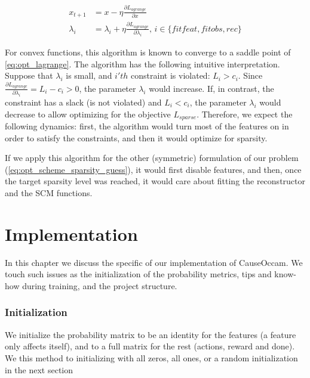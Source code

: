 \documentclass[a4paper,11pt,oneside]{report}
\newcommand{\sysname}{CauseOccam\xspace}
\begin{document}
\begin{equation}
\label{eq:primaldual}
\begin{array}{rl}
x_{t+1}&=x-\eta\frac{\partial L_{agrange}}{\partial x}\\
\lambda_i&=\lambda_i+\eta\frac{\partial L_{agrange}}{\partial \lambda_i},\,i\in\{fitfeat,fitobs,rec\}
\end{array}
\end{equation}

For convex functions, this algorithm is known to converge to a saddle point of \autoref{eq:opt_lagrange}. The algorithm has the following intuitive interpretation. Suppose that $\lambda_i$ is small, and $i'th$ constraint is violated: $L_i>c_i$. Since $\frac{\partial L_{agrange}}{\partial \lambda_i}=L_i-c_i>0$, the parameter $\lambda_i$ would increase. If, in contrast, the constraint has a slack (is not violated) and $L_i<c_i$, the parameter $\lambda_i$ would decrease to allow optimizing for the objective $L_{sparse}$.
Therefore, we expect the following dynamics: first, the algorithm would turn most of the features on in order to satisfy the constraints, and then it would optimize for sparsity.

If we apply this algorithm for the other (symmetric) formulation of our problem (\autoref{eq:opt_scheme_sparsity_guess}), it would first disable features, and then, once the target sparsity level was reached, it would care about fitting the reconstructor and the SCM functions.




\chapter{Implementation}
\label{ch:implementation}
In this chapter we discuss the specific of our implementation of \sysname. We touch such issues as the initialization of the probability metrics, tips and know-how during training, and the project structure.

\subsection{Initialization}
We initialize the probability matrix to be an identity for the features (a feature only affects itself), and to a full matrix for the rest (actions, reward and done). We this method to initializing with all zeros, all ones, or a random initialization in the next section
\end{document}
